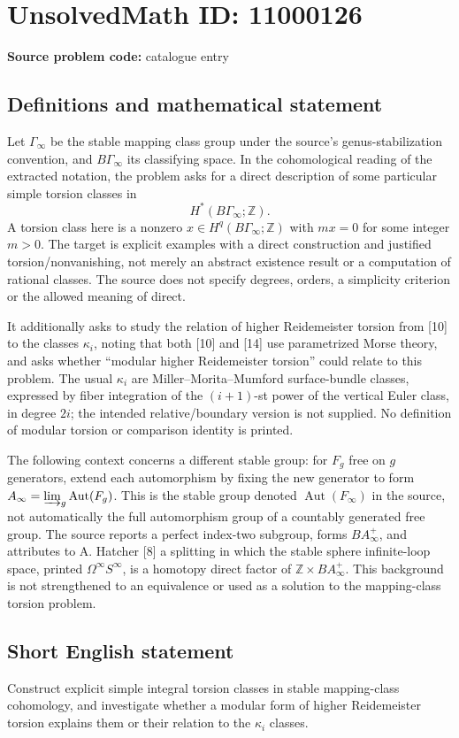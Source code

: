 \documentclass[11pt]{article}
\newcommand{\Z}{\mathbb{Z}}
\begin{document}
\section*{UnsolvedMath ID: 11000126}
\textbf{Source problem code:} catalogue entry
\subsection{Definitions and mathematical statement}
Let \(\Gamma_\infty\) be the stable mapping class group under the source's genus-stabilization convention, and \(B\Gamma_\infty\) its classifying space. In the cohomological reading of the extracted notation, the problem asks for a direct description of some particular simple torsion classes in
\[
 H^*(B\Gamma_\infty;\Z).
\]
A torsion class here is a nonzero \(x\in H^q(B\Gamma_\infty;\Z)\) with \(mx=0\) for some integer \(m>0\). The target is explicit examples with a direct construction and justified torsion/nonvanishing, not merely an abstract existence result or a computation of rational classes. The source does not specify degrees, orders, a simplicity criterion or the allowed meaning of direct.

It additionally asks to study the relation of higher Reidemeister torsion from [10] to the classes \(\kappa_i\), noting that both [10] and [14] use parametrized Morse theory, and asks whether ``modular higher Reidemeister torsion'' could relate to this problem. The usual \(\kappa_i\) are Miller--Morita--Mumford surface-bundle classes, expressed by fiber integration of the \((i+1)\)-st power of the vertical Euler class, in degree \(2i\); the intended relative/boundary version is not supplied. No definition of modular torsion or comparison identity is printed.

The following context concerns a different stable group: for \(F_g\) free on \(g\) generators, extend each automorphism by fixing the new generator to form \(A_\infty=\varinjlim_g\operatorname{Aut}(F_g)\). This is the stable group denoted \(\operatorname{Aut}(F_\infty)\) in the source, not automatically the full automorphism group of a countably generated free group. The source reports a perfect index-two subgroup, forms \(BA_\infty^+\), and attributes to A. Hatcher [8] a splitting in which the stable sphere infinite-loop space, printed \(\Omega^\infty S^\infty\), is a homotopy direct factor of \(\Z\times BA_\infty^+\). This background is not strengthened to an equivalence or used as a solution to the mapping-class torsion problem.
\subsection{Short English statement}
Construct explicit simple integral torsion classes in stable mapping-class cohomology, and investigate whether a modular form of higher Reidemeister torsion explains them or their relation to the \(\kappa_i\) classes.
\end{document}
